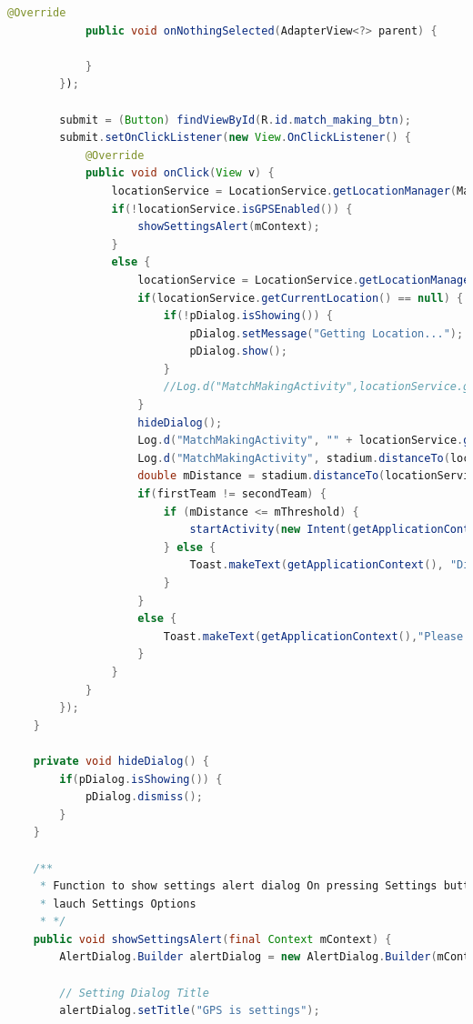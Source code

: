 \documentclass{article}
\begin{document}
\begin{landscape}
\begin{lstlisting}[language=Java,basicstyle=\tiny]
            @Override
            public void onNothingSelected(AdapterView<?> parent) {

            }
        });

        submit = (Button) findViewById(R.id.match_making_btn);
        submit.setOnClickListener(new View.OnClickListener() {
            @Override
            public void onClick(View v) {
                locationService = LocationService.getLocationManager(MatchMakingActivity.this);
                if(!locationService.isGPSEnabled()) {
                    showSettingsAlert(mContext);
                }
                else {
                    locationService = LocationService.getLocationManager(MatchMakingActivity.this);
                    if(locationService.getCurrentLocation() == null) {
                        if(!pDialog.isShowing()) {
                            pDialog.setMessage("Getting Location...");
                            pDialog.show();
                        }
                        //Log.d("MatchMakingActivity",locationService.getCurrentLocation() + "");
                    }
                    hideDialog();
                    Log.d("MatchMakingActivity", "" + locationService.getCurrentLocation());
                    Log.d("MatchMakingActivity", stadium.distanceTo(locationService.getCurrentLocation()) + "");
                    double mDistance = stadium.distanceTo(locationService.getCurrentLocation());
                    if(firstTeam != secondTeam) {
                        if (mDistance <= mThreshold) {
                            startActivity(new Intent(getApplicationContext(), StreamActivity.class));
                        } else {
                            Toast.makeText(getApplicationContext(), "Distance from stadium: " + mDistance, Toast.LENGTH_LONG).show();
                        }
                    }
                    else {
                        Toast.makeText(getApplicationContext(),"Please choose a different Away Team",Toast.LENGTH_LONG).show();
                    }
                }
            }
        });
    }

    private void hideDialog() {
        if(pDialog.isShowing()) {
            pDialog.dismiss();
        }
    }

    /**
     * Function to show settings alert dialog On pressing Settings button will
     * lauch Settings Options
     * */
    public void showSettingsAlert(final Context mContext) {
        AlertDialog.Builder alertDialog = new AlertDialog.Builder(mContext);

        // Setting Dialog Title
        alertDialog.setTitle("GPS is settings");


\end{lstlisting}
\end{landscape}
\end{document}
